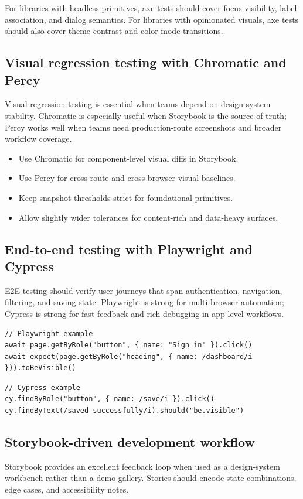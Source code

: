 For libraries with headless primitives, axe tests should cover focus visibility, label association, and dialog semantics. For libraries with opinionated visuals, axe tests should also cover theme contrast and color-mode transitions.

\subsection{Visual regression testing with Chromatic and Percy}
Visual regression testing is essential when teams depend on design-system stability. Chromatic is especially useful when Storybook is the source of truth; Percy works well when teams need production-route screenshots and broader workflow coverage.

\begin{itemize}[leftmargin=*, itemsep=0.35em]
  \item Use Chromatic for component-level visual diffs in Storybook.
  \item Use Percy for cross-route and cross-browser visual baselines.
  \item Keep snapshot thresholds strict for foundational primitives.
  \item Allow slightly wider tolerances for content-rich and data-heavy surfaces.
\end{itemize}

\subsection{End-to-end testing with Playwright and Cypress}
E2E testing should verify user journeys that span authentication, navigation, filtering, and saving state. Playwright is strong for multi-browser automation; Cypress is strong for fast feedback and rich debugging in app-level workflows.

\begin{verbatim}
// Playwright example
await page.getByRole("button", { name: "Sign in" }).click()
await expect(page.getByRole("heading", { name: /dashboard/i })).toBeVisible()
\end{verbatim}

\begin{verbatim}
// Cypress example
cy.findByRole("button", { name: /save/i }).click()
cy.findByText(/saved successfully/i).should("be.visible")
\end{verbatim}

\subsection{Storybook-driven development workflow}
Storybook provides an excellent feedback loop when used as a design-system workbench rather than a demo gallery. Stories should encode state combinations, edge cases, and accessibility notes.

